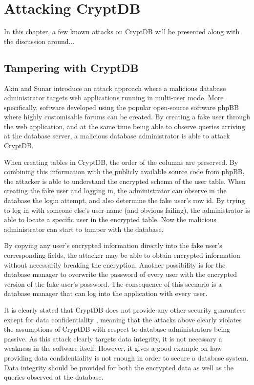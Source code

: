 \chapter{Attacking CryptDB}
\label{chp:attacks}

In this chapter, a few known attacks on CryptDB will be presented along with the discussion around...

\section{Tampering with CryptDB}

Akin and Sunar \cite{akin_2014} introduce an attack approach where a malicious database administrator targets web applications running in multi-user mode. More specifically, software developed using the popular open-source software phpBB \cite{phpBB} where highly customisable forums can be created. By creating a fake user through the web application, and at the same time being able to observe queries arriving at the database server, a malicious database administrator is able to attack CryptDB.

When creating tables in CryptDB, the order of the columns are preserved. By combining this information with the publicly available source code from phpBB, the attacker is able to understand the encrypted schema of the user table. When creating the fake user and logging in, the administrator can observe in the database the login attempt, and also determine the fake user's row id. By trying to log in with someone else's user-name (and obvious failing), the administrator is able to locate a specific user in the encrypted table. Now the malicious administrator can start to tamper with the database.

By copying any user's encrypted information directly into the fake user's corresponding fields, the attacker may be able to obtain encrypted information without necessarily breaking the encryption. Another possibility is for the database manager to overwrite the password of every user with the encrypted version of the fake user's password. The consequence of this scenario is a database manager that can log into the application with every user.

It is clearly stated that CryptDB does not provide any other security guarantees except for data confidentiality \cite{CryptDB_Main_Paper}, meaning that the attacks above clearly violates the assumptions of CryptDB with respect to database administrators being passive. As this attack clearly targets data integrity, it is not necessary a weakness in the software itself. However, it gives a good example on how providing data confidentiality is not enough in order to secure a database system. Data integrity should be provided for both the encrypted data as well as the queries observed at the database.
 


